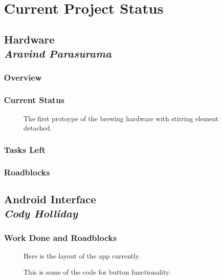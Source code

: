 \documentclass[draftclsnofoot,onecolumn,letterpaper,10pt]{IEEEtran}
\begin{document}
\section{Current Project Status}

\subsection{Hardware\\{\em\textbf{Aravind Parasurama}}}
\subsubsection{Overview}

\subsubsection{Current Status}
\begin{figure}
\label{fig:hw1}
\caption{The first protoype of the brewing hardware with stirring element detached.}
\end{figure}

\subsubsection{Tasks Left}

\subsubsection{Roadblocks}

\subsection{Android Interface\\{\em\textbf{Cody Holliday}}}


\subsubsection{Work Done and Roadblocks}

\newpage
\vfill

\begin{figure}
\label{fig:layout}
\caption{Here is the layout of the app currently.}
\end{figure}


\begin{figure}
\label{fig:code}
\caption{This is some of the code for button functionality.}
\end{figure}
\end{document}
